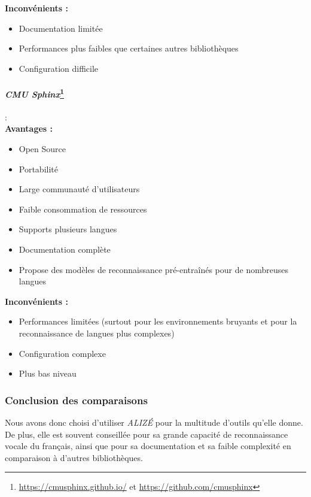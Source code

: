 \textbf{Inconvénients :}
\begin{itemize}
    \item Documentation limitée
    \item Performances plus faibles que certaines autres bibliothèques
    \item Configuration difficile
\end{itemize}

\paragraph*{\textbf{\textit{CMU Sphinx}}\footnote{\url{https://cmusphinx.github.io/} et \url{https://github.com/cmusphinx}}}: \\

\textbf{Avantages :}
\begin{itemize}
    \item Open Source
    \item Portabilité
    \item Large communauté d'utilisateurs
    \item Faible consommation de ressources
    \item Supports plusieurs langues
    \item Documentation complète
    \item Propose des modèles de reconnaissance pré-entraînés pour de nombreuses langues
\end{itemize}

\textbf{Inconvénients :}
\begin{itemize}
    \item Performances limitées (surtout pour les environnements bruyants et pour la reconnaissance de langues plus complexes)
    \item Configuration complexe
    \item Plus bas niveau
\end{itemize}



\subsubsection*{Conclusion des comparaisons}

Nous avons donc choisi d'utiliser \textit{ALIZÉ} pour la multitude d'outils qu'elle donne. De plus, elle est souvent conseillée pour sa grande capacité de reconnaissance vocale
du français, ainsi que pour sa documentation et sa faible complexité en comparaison à d'autres bibliothèques.

